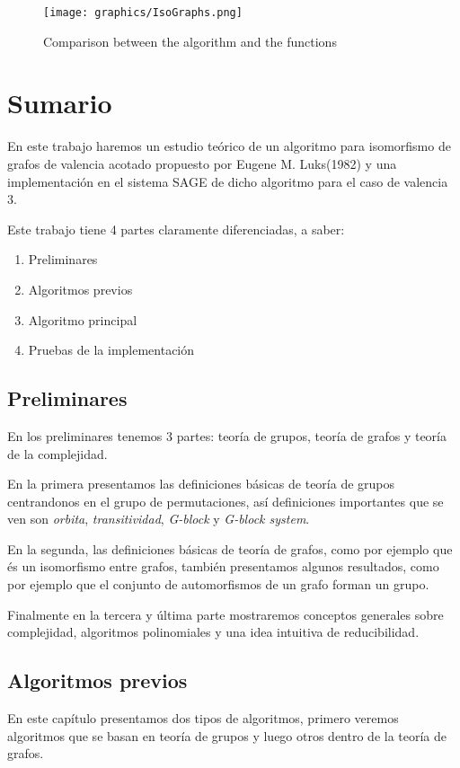 \documentclass[12pt,a4paper]{book}
\theoremstyle{plain}
\theoremstyle{definition}
\theoremstyle{remark}
\begin{document}
\begin{center}
\begin{figure}
\centering
\texttt{[image: graphics/IsoGraphs.png]}
\caption{Comparison between the algorithm and the functions  }\label{Graphic4}
\end{figure}

\appendix




\chapter*{Sumario}

En este trabajo haremos un estudio teórico de un algoritmo para isomorfismo de grafos de valencia acotado propuesto por Eugene 
M. Luks(1982) y una implementación en el sistema SAGE de dicho algoritmo para el caso de valencia 3. 

Este trabajo tiene 4 partes claramente diferenciadas, a saber:
\begin{enumerate}
 \item Preliminares
 \item Algoritmos previos
 \item Algoritmo principal
 \item Pruebas de la implementación
\end{enumerate}

\section*{Preliminares}
En los preliminares tenemos 3 partes: teoría de grupos, teoría de grafos y teoría de la complejidad.

En la primera  presentamos las definiciones básicas de teoría de grupos centrandonos en el grupo de permutaciones, así 
definiciones importantes que se ven son \emph{orbita}, \emph{transitividad}, \emph{G-block} y \emph{G-block system}.

En la segunda, las  definiciones básicas de teoría de grafos, como por ejemplo que és un isomorfismo entre grafos, 
también presentamos algunos resultados, como por ejemplo  que el conjunto de automorfismos de un grafo forman un grupo. 

Finalmente en la tercera y última parte mostraremos conceptos generales  sobre complejidad,  algoritmos polinomiales y una idea intuitiva 
de reducibilidad.

\section*{Algoritmos previos}
En este capítulo presentamos dos tipos de algoritmos, primero veremos algoritmos que se basan en teoría de grupos y luego  
otros dentro de la teoría de grafos.


\end{center}
\end{document}
